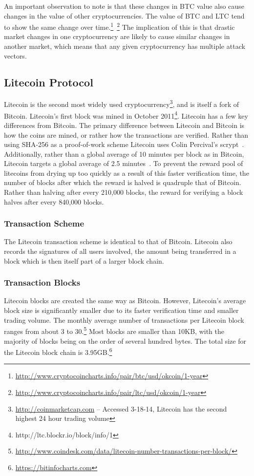 \documentclass[11pt]{article}
\begin{document}
An important observation to note is that these changes in BTC value also cause changes in the value of other
cryptocurrencies. The value of BTC and LTC tend to show the same change over time.\footnote{\url{http://www.cryptocoincharts.info/pair/btc/usd/okcoin/1-year}}~\footnote{\url{http://www.cryptocoincharts.info/pair/ltc/usd/okcoin/1-year}}
The implication of this is that drastic market changes in one cryptocurrency are likely to cause similar changes in
another market, which means that any given cryptocurrency has multiple attack vectors.

\subsection{Litecoin Protocol} Litecoin is the second most widely used cryptocurrency\footnote{\url{http://coinmarketcap.com} -- Accessed 3-18-14, Litecoin has the second highest 24 hour
trading volume}, and is itself a fork of Bitcoin. Litecoin's first block was mined in October
2011\footnote{http://ltc.blockr.io/block/info/1}. Litecoin has a few key differences from Bitcoin.  The primary
difference between Litecoin and Bitcoin is how the coins are mined, or rather how the transactions are verified. Rather
than using SHA-256 as a proof-of-work scheme Litecoin uses Colin Percival's scrypt~\cite{percival09}. Additionally,
rather than a global average of 10 minutes per block as in Bitcoin, Litecoin targets a global average of 2.5
minutes~\cite{sprankel13}. To prevent the reward pool of litecoins from drying up too quickly as a result of this faster
verification time, the number of blocks after which the reward is halved is quadruple that of Bitcoin. Rather than
halving after every 210,000 blocks, the reward for verifying a block halves after every 840,000 blocks.

\subsubsection{Transaction Scheme} The Litecoin transaction scheme is identical to that of Bitcoin. Litecoin also
records the signatures of all users involved, the amount being transferred in a block which is then itself part of a
larger block chain.

\subsubsection{Transaction Blocks}
Litecoin blocks are created the same way as Bitcoin. However, Litecoin's average block size is significantly smaller due
to its faster verification time and smaller trading volume. The monthly average number of transactions per Litecoin
block ranges from about 3 to 30.\footnote{\url{http://www.coindesk.com/data/litecoin-number-transactions-per-block/}}
Most blocks are smaller than 10KB, with the majority of blocks being on the order of several hundred bytes. The total
size for the Litecoin block chain is 3.95GB.\footnote{\url{https://bitinfocharts.com}}
\end{document}
